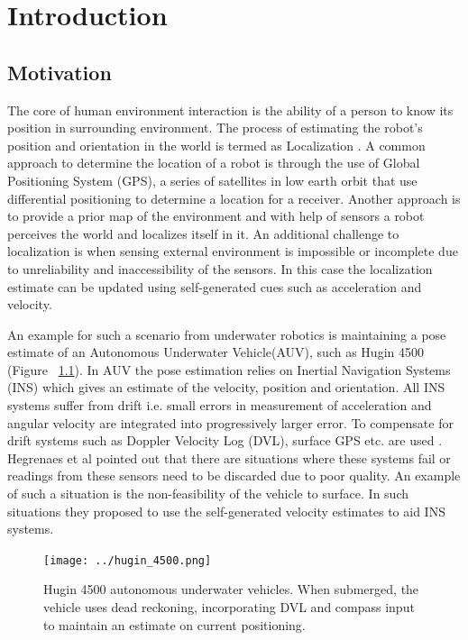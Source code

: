 \documentclass[12pt]{dalcsthesis}
\begin{document}
\chapter{Introduction}
 





\section{Motivation}
The core of human environment interaction is the ability of a person to know its position in surrounding environment. The process of estimating the robot's position and orientation in the world is termed as Localization \cite{thrun2005probabilistic}.  A common approach to determine the location of a robot is through the use of Global Positioning System (GPS), a series of satellites in low earth orbit that use differential positioning to determine a location for a receiver.  Another approach is to provide a prior map of the environment and with help of sensors a robot perceives the world and localizes itself in it. An additional challenge to localization is when sensing external environment is impossible or incomplete due to unreliability and inaccessibility of the sensors. In this case the localization estimate can be updated using self-generated cues such as acceleration and velocity.  

An example for such a scenario from underwater robotics is maintaining a pose estimate of an Autonomous Underwater Vehicle(AUV), such as Hugin 4500 (Figure ~\ref{fig-Hugin 4500}). In AUV the pose estimation relies on Inertial Navigation Systems (INS) which gives an estimate of the velocity, position and orientation.  All INS systems suffer from drift i.e. small errors in measurement of acceleration and angular velocity are integrated into progressively larger error.  To compensate for drift systems such as Doppler Velocity Log (DVL), surface GPS etc. are used \cite{Lammas2004} \cite{leonard1998autonomous}. Hegrenaes et al \cite{Hegrenæs2008} pointed out that there are situations where these systems fail or readings from these sensors need to be discarded due to poor quality.  An example of such a situation is the non-feasibility of the vehicle to surface.  In such situations they proposed to use the self-generated velocity estimates to aid INS systems. 
\begin{figure}
  \centering
     {\texttt{[image: ../hugin\_4500.png]}}
  \caption{\label{fig-Hugin 4500} Hugin 4500 autonomous underwater vehicles. When submerged, the vehicle uses dead reckoning, incorporating DVL and compass input to maintain an estimate on current positioning.
}
\end{figure}
\end{document}
